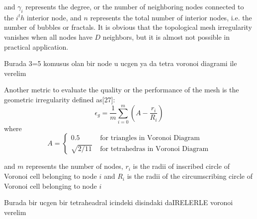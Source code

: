 \documentclass[twoside]{article}
\begin{document}
	and $\gamma _i$ represents the degree, or the number of neighboring nodes connected to the $i^th$ interior node, and $n$ represents the total number of interior nodes, i.e. the number of bubbles or fractals. It is obvious that the topological mesh irregularity vanishes when all nodes have $D$ neighbors, but it is almost not possible in practical application. 
	
	Burada 3=5 komusus olan bir node u ucgen ya da tetra voronoi diagrami ile verelim
	
	Another metric to evaluate the quality or the performance of the mesh is the geometric irregularity defined as[27]:
	\begin{equation}
\epsilon _g = \frac{1}{m} \sum_{i = 0}^{m} (A-\frac{r_i}{R_i})
	\end{equation}
	where 
		\begin{equation}
		A = \left\{ \begin{array}{rl}
		0.5                               &\mbox{ for triangles in Voronoi Diagram} \\
		\sqrt{2/11}                   &\mbox{ for tetrahedras in Voronoi Diagram}
		\end{array} \right.
		\end{equation}
		
		and $m$ represents the number of nodes, $r_i$ is the radii of inscribed circle of Voronoi cell belonging to node $i$ and $R_i$ is the radii of the circumscribing circle of Voronoi cell belonging to node $i$
	
	Burada bir ucgen bir tetraheadral icindeki disindaki daIRELERLE  voronoi verelim
	
	
	
\end{document}
